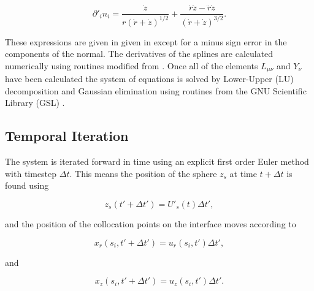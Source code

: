 \documentclass[12pt]{article}
\begin{document}
\begin{equation}
\label{equ:div_norm}
\partial'_{i} n_{i} = \frac{\dot{z}}{r (\dot{r} + \dot{z})^{1/2}} + \frac{\dot{r} \ddot{z} - \ddot{r} \dot{z}}{(\dot{r} + \dot{z})^{3/2}}.
\end{equation}

These expressions are given in given in \citep{Manga94} except for a minus sign error in the components of the normal. The derivatives of the splines are calculated numerically using routines modified from \citet{Press07}. Once all of the elements $L_{\mu\nu}$ and $Y_{\nu}$ have been calculated the system of equations is solved by Lower-Upper (LU) decomposition and Gaussian elimination \citep{Riley06, Press07} using routines from the GNU Scientific Library (GSL) \citep{Galassi09}.

\subsection{Temporal Iteration}
\label{subsec:time}

The system is iterated forward in time using an explicit first order Euler method \citep{Manga94} with timestep $\Delta t$. This means the position of the sphere $z_{s}$ at time $t + \Delta t$ is found using

\begin{equation}
\label{equ:sphere_it}
z_{s}(t' + \Delta t') = U'_{s}(t) \Delta t',
\end{equation}

and the position of the collocation points on the interface moves according to

\begin{equation}
\label{equ:int_it}
x_{r}(s_{i}, t' + \Delta t') = u_{r}(s_{i},t') \Delta t',
\end{equation}

and

\begin{equation}
\label{equ:int_it}
x_{z}(s_{i}, t' + \Delta t') = u_{z}(s_{i},t') \Delta t'.
\end{equation}
\end{document}
